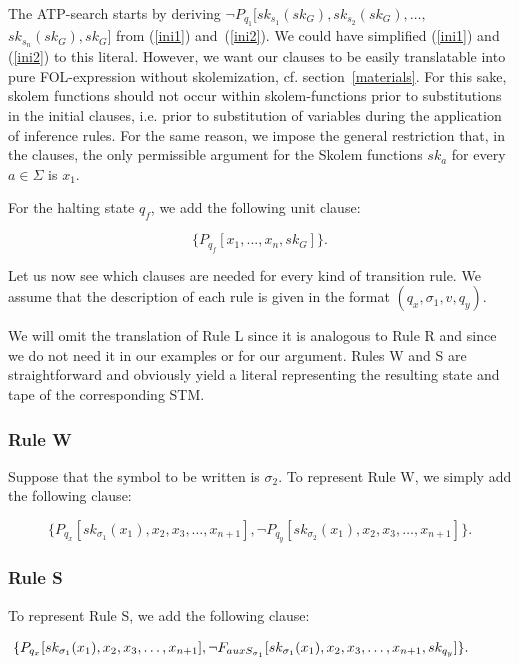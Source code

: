 \documentclass[%
  manuscript=article,   %
  year=2024,
  volume=77,
  doi=00000.000,
]{zfn}
\begin{document}
The ATP-search starts by deriving $\neg P_{q_1}[sk_{s_1}(sk_G),sk_{s_2}(sk_G), \ldots,$ $sk_{s_n}(sk_G), sk_G]$ from (\ref{ini1}) and~(\ref{ini2}). We could have simplified (\ref{ini1}) and (\ref{ini2}) to this literal. However, we want our clauses to be easily translatable into pure FOL-expression without skolemization, cf. section~\ref{materials}. For this sake, skolem functions should not occur within skolem-functions prior to substitutions in the initial clauses, i.e. prior to substitution of variables during the application of inference rules. For the same reason,  we impose the general restriction that, in the clauses, the only permissible argument for the Skolem functions $sk_a$ for every $a \in \Sigma$ is $x_1$. \label{x1rest}

For the halting state $q_f$, we add the following unit clause:

\begin{equation}
\{P_{q_f}[x_1, ..., x_n, sk_G]\}.
\end{equation}

Let us now see which clauses are needed for every kind of transition rule. We assume that the description of each rule is given in the format $(q_x, \sigma_1, v, q_y)$.

We will omit the translation of Rule L since it is analogous to Rule R and since we do not need it in our examples or for our argument. Rules W and S are straightforward and obviously yield a literal representing the resulting state and tape of the corresponding STM.

\subsubsection{Rule W}

Suppose that the symbol to be written is $\sigma_2$. To represent Rule W, we simply add the following clause:

\begin{equation}
 \{P_{q_x}[sk_{\sigma_1}(x_1), x_2, x_3, \ldots, x_{n+1}],
 \neg P_{q_y}[sk_{\sigma_2}(x_1), x_2, x_3, \ldots, x_{n+1}]\}.
\end{equation}

\subsubsection{Rule S}

To represent Rule S, we add the following clause:

\begin{small}
\begin{equation}
\hspace{-0.95cm} \{P_{q_x}[sk_{\sigma_1}(x_1), x_2, x_3, \ldots, x_{n+1}],
 \neg F_{auxS_{\sigma_1}}[sk_{\sigma_1}(x_1), x_2, x_3, \ldots, x_{n+1}, sk_{q_y}]\}.
\end{equation}
\end{small}
\end{document}
